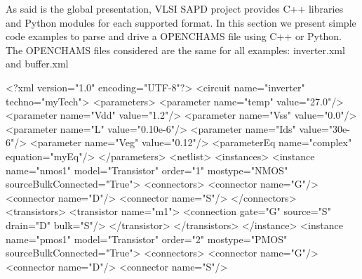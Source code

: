 As said is the global presentation, V\-L\-S\-I S\-A\-P\-D project provides C++ libraries and Python modules for each supported format. In this section we present simple code examples to parse and drive a O\-P\-E\-N\-C\-H\-A\-M\-S file using C++ or Python. The O\-P\-E\-N\-C\-H\-A\-M\-S files considered are the same for all examples\-: {\ttfamily inverter.\-xml} and {\ttfamily buffer.\-xml} 
\begin{DoxyCodeInclude}
<?xml version=\textcolor{stringliteral}{"1.0"} encoding=\textcolor{stringliteral}{"UTF-8"}?>
<circuit name=\textcolor{stringliteral}{"inverter"} techno=\textcolor{stringliteral}{"myTech"}>
  <parameters>
    <parameter   name=\textcolor{stringliteral}{"temp"}    value=\textcolor{stringliteral}{"27.0"}/>
    <parameter   name=\textcolor{stringliteral}{"Vdd"}     value=\textcolor{stringliteral}{"1.2"}/>
    <parameter   name=\textcolor{stringliteral}{"Vss"}     value=\textcolor{stringliteral}{"0.0"}/>
    <parameter   name=\textcolor{stringliteral}{"L"}       value=\textcolor{stringliteral}{"0.10e-6"}/>
    <parameter   name=\textcolor{stringliteral}{"Ids"}     value=\textcolor{stringliteral}{"30e-6"}/>
    <parameter   name=\textcolor{stringliteral}{"Veg"}     value=\textcolor{stringliteral}{"0.12"}/>
    <parameterEq name=\textcolor{stringliteral}{"complex"} equation=\textcolor{stringliteral}{"myEq"}/>
  </parameters>
  <netlist>
    <instances>
      <instance name=\textcolor{stringliteral}{"nmos1"} model=\textcolor{stringliteral}{"Transistor"} order=\textcolor{stringliteral}{"1"} mostype=\textcolor{stringliteral}{"NMOS"} sourceBulkConnected=\textcolor{stringliteral}{"True"}>
        <connectors>
          <connector name=\textcolor{stringliteral}{"G"}/>
          <connector name=\textcolor{stringliteral}{"D"}/>
          <connector name=\textcolor{stringliteral}{"S"}/>
        </connectors>
        <transistors>
          <transistor name=\textcolor{stringliteral}{"m1"}>
            <connection gate=\textcolor{stringliteral}{"G"} source=\textcolor{stringliteral}{"S"} drain=\textcolor{stringliteral}{"D"} bulk=\textcolor{stringliteral}{"S"}/>
          </transistor>
        </transistors>
      </instance>
      <instance name=\textcolor{stringliteral}{"pmos1"} model=\textcolor{stringliteral}{"Transistor"} order=\textcolor{stringliteral}{"2"} mostype=\textcolor{stringliteral}{"PMOS"} sourceBulkConnected=\textcolor{stringliteral}{"True"}>
        <connectors>
          <connector name=\textcolor{stringliteral}{"G"}/>
          <connector name=\textcolor{stringliteral}{"D"}/>
          <connector name=\textcolor{stringliteral}{"S"}/>

\end{DoxyCodeInclude}
